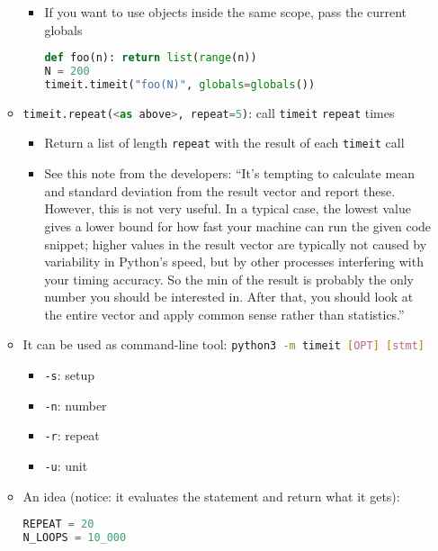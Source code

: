 \documentclass[a4paper,12pt,%
              final%
              ]{article}
\begin{document}
\begin{itemize}
\begin{itemize}
\begin{itemize}
\begin{lstlisting}[language=python]
\end{lstlisting}
          \item If you want to use objects inside the same scope, pass the current globals
\begin{lstlisting}[language=python]
def foo(n): return list(range(n))
N = 200
timeit.timeit("foo(N)", globals=globals())
\end{lstlisting}
        \end{itemize}
      \item \lstinline[language=python]{timeit.repeat(<as above>, repeat=5)}: call \texttt{timeit} \texttt{repeat} times
        \begin{itemize}
          \item Return a list of length \texttt{repeat} with the result of each \texttt{timeit} call
          \item See this note from the developers: ``It’s tempting to calculate mean and standard deviation from the result vector and report these. However, this is not very useful. In a typical case, the lowest value gives a lower bound for how fast your machine can run the given code snippet; higher values in the result vector are typically not caused by variability in Python’s speed, but by other processes interfering with your timing accuracy. So the min of the result is probably the only number you should be interested in. After that, you should look at the entire vector and apply common sense rather than statistics.''
        \end{itemize}
      \item It can be used as command-line tool: \lstinline[language=bash]{python3 -m timeit [OPT] [stmt]}
        \begin{itemize}
          \item \verb|-s|: setup
          \item \verb|-n|: number
          \item \verb|-r|: repeat
          \item \verb|-u|: unit
        \end{itemize}
      \item An idea (notice: it evaluates the statement and return what it gets):
\begin{lstlisting}[language=python]
REPEAT = 20
N_LOOPS = 10_000


\end{lstlisting}
\end{itemize}
\end{itemize}
\end{document}

